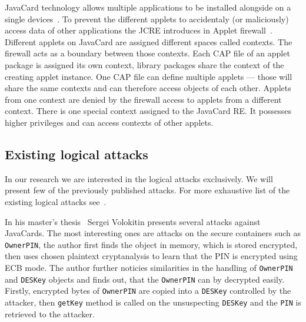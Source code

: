 \documentclass{../llncs/llncs}
\begin{document}
    JavaCard technology allows multiple applications to be installed alongside on a single devices~\cite{jcspecs31download}. To prevent the different applets to accidentaly (or maliciously) access data of other applications the JCRE introduces in Applet firewall~\cite{jcspecs31download}. Different applets on JavaCard are assigned different spaces called contexts. The firewall acts as a boundary between those contexts. Each CAP file of an applet package is assigned its own context, library packages share the context of the creating applet instance. One CAP file can define multiple applets --- those will share the same contexts and can therefore access objects of each other. Applets from one context are denied by the firewall access to applets from a different context.
    There is one special context assigned to the JavaCard RE. It possesses higher privileges and can access contexts of other applets.


    \subsection{Existing logical attacks}
    In our research we are interested in the logical attacks exclusively. We will present few of the previously published attacks. For more exhaustive list of the existing logical attacks see~\cite{anon2020thesis,sergei,se:oracle:part1,se:oracle:part2,se:oracle:part3}.

    In his master's thesis~\cite{sergei} Sergei Volokitin presents several attacks against JavaCards.
    The most interesting ones are attacks on the secure containers such as \texttt{OwnerPIN}, the author first finds the object in memory, which is stored encrypted, then uses chosen plaintext cryptanalysis to learn that the PIN is encrypted using ECB mode. The author further noticies similarities in the handling of \texttt{OwnerPIN} and \texttt{DESKey} objects and finds out, that the \texttt{OwnerPIN} can by decrypted easily. Firstly, encrypted bytes of \texttt{OwnerPIN} are copied into a \texttt{DESKey} controlled by the attacker, then \texttt{getKey} method is called on the unsuspecting \texttt{DESKey} and the \texttt{PIN} is retrieved to the attacker.
\end{document}
